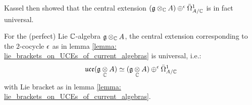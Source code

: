         Kassel then showed that the central extension $(\g \tensor_{\bbC} A) \oplus^{\e} \bar{\Omega}^1_{A/\bbC}$ is in fact universal.
        \begin{theorem} \label{theorem: kassel_realisation}
            \cite[Corollary 3.5]{kassel_universal_central_extensions_of_lie_algebras} For the (perfect) Lie $\mathbb{C}$-algebra $\g \tensor_{\bbC} A$, the central extension corresponding to the $2$-cocycle $\epsilon$ as in lemma \ref{lemma: lie_brackets_on_UCEs_of_current_algebras} is universal, i.e.:
                $$\uce(\g \tensor_{\bbC} A) \cong (\g \tensor_{\bbC} A) \oplus^{\e} \bar{\Omega}^1_{A/\bbC}$$
            with Lie bracket as in lemma \ref{lemma: lie_brackets_on_UCEs_of_current_algebras}.
        \end{theorem}